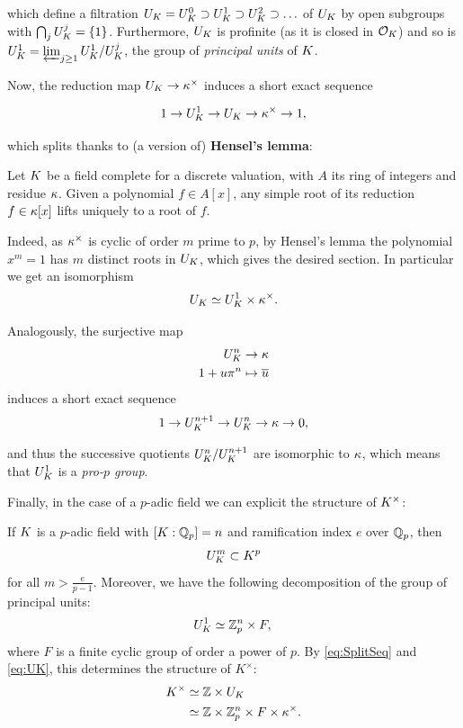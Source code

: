 \documentclass[a4paper, oneside]{memoir}
\begin{document}
which define a filtration $U_K = U_K^0\supset U_K^1\supset U_K^2\supset\ldots$ of $U_K$ by open subgroups with $\bigcap_j{U_K^j}=\{1\}$. Furthermore, $U_K$ is profinite (as it is closed in $\mathcal{O}_K$) and so is $U_K^1=\varprojlim_{j\geq 1}{U_K^1 / U_K^j}$, the group of \textit{principal units} of $K$.

Now, the reduction map $U_K\to \kappa^\times$ induces a short exact sequence

\[
    1\to U_K^1\to U_K\to \kappa^\times \to 1,
\]

which splits thanks to (a version of) \textbf{Hensel's lemma}:

\begin{proposition}
    Let $K$ be a field complete for a discrete valuation, with $A$ its ring of integers and residue $\kappa$.
    Given a polynomial $f\in A[x]$, any simple root of its reduction $f\in \kappa[x]$ lifts uniquely to a root of $f$.
\end{proposition}

Indeed, as $\kappa^\times$ is cyclic of order $m$ prime to $p$, by Hensel's lemma the polynomial $x^m=1$ has $m$ distinct roots in $U_K$, which gives the desired section. In particular we get an isomorphism
\begin{equation}\label{eq:UK}
    U_K\simeq U_K^1\times\kappa^\times.
\end{equation}

Analogously, the surjective map
\begin{align*}
    U_K^n       & \to \kappa               \\
    1 + u \pi ^n & \mapsto \overline{u}
\end{align*}
induces a short exact sequence
\[
    1\to U_K^{n+1} \to U_K^n\to \kappa\to 0,
\]

and thus the successive quotients $U_K^n/U_K^{n+1}$ are isomorphic to $\kappa$, which means that $U_K^1$ is a \textit{pro-$p$ group}.

Finally, in the case of a $p$-adic field we can explicit the structure of $K^\times$:

\begin{theorem}\label{thm:StructureLocalFields}
    If $K$ is a $p$-adic field with $[K:\mathbb{Q}_p]=n$ and ramification index $e$ over $\mathbb{Q}_p$, then
    \[
        U_K^m \subset K^p
    \]
    for all $m> \frac{e}{p-1}$. Moreover, we have the following decomposition of the group of principal units:
    \begin{equation*}
        U_K^1 \simeq \mathbb{Z}_p^n \times F, \\
    \end{equation*}
    where $F$ is a finite cyclic group of order a power of $p$.
    By \eqref{eq:SplitSeq} and \eqref{eq:UK}, this determines the structure of $K^\times$:
    \begin{align*}
        K^\times & \simeq \mathbb{Z} \times U_K                             \\
                  & \simeq \mathbb{Z} \times \mathbb{Z}_p^n \times F \times \kappa^\times.
    \end{align*}
\end{theorem}
\end{document}
